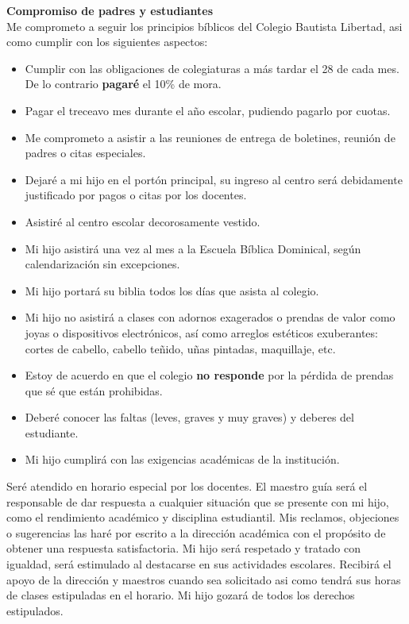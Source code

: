 \documentclass[12pt]{article}
\begin{document}
    \textbf{Compromiso de padres y estudiantes}\\
    Me comprometo a seguir los principios bíblicos del Colegio Bautista Libertad, asi como cumplir con los siguientes aspectos:
    \begin{itemize}
        \item Cumplir con las obligaciones de colegiaturas a más tardar el 28 de cada mes. De lo contrario \textbf{pagaré} el 10\% de mora.
        \item Pagar el treceavo mes durante el año escolar, pudiendo pagarlo por cuotas.
        \item Me comprometo a asistir a las reuniones de entrega de boletines, reunión de padres o citas especiales.
        \item Dejaré a mi hijo en el portón principal, su ingreso al centro será debidamente justificado por pagos o citas por los docentes.
        \item Asistiré al centro escolar decorosamente vestido.
        \item Mi hijo asistirá una vez al mes a la Escuela Bíblica Dominical, según calendarización sin excepciones.
        \item Mi hijo portará su biblia todos los días que asista al colegio.
        \item Mi hijo no asistirá a clases con adornos exagerados o prendas de valor como joyas o dispositivos electrónicos, así como arreglos estéticos exuberantes: cortes de cabello, cabello teñido, uñas pintadas, maquillaje, etc.
        \item Estoy de acuerdo en que el colegio \textbf{no responde} por la pérdida de prendas que sé que están prohibidas.
        \item Deberé conocer las faltas (leves, graves y muy graves) y deberes del estudiante.
        \item Mi hijo cumplirá con las exigencias académicas de la institución.
    \end{itemize}
    Seré atendido en horario especial por los docentes.
    El maestro guía será el responsable de dar respuesta a cualquier situación que se presente con mi hijo, como el rendimiento académico y disciplina estudiantil.
    Mis reclamos, objeciones o sugerencias las haré por escrito a la dirección académica con el propósito de obtener una respuesta satisfactoria.
    Mi hijo será respetado y tratado con igualdad, será estimulado al destacarse en sus actividades escolares.
    Recibirá el apoyo de la dirección y maestros cuando sea solicitado asi como tendrá sus horas de clases estipuladas en el horario.
    Mi hijo gozará de todos los derechos estipulados.
    
\end{document}
